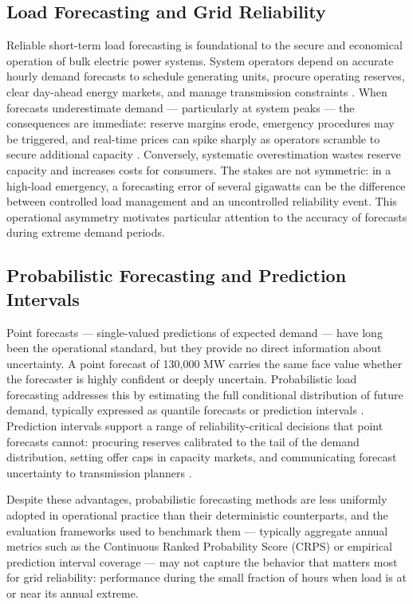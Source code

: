 \documentclass[12pt,a4paper]{article}
\begin{document}
\subsection{Load Forecasting and Grid Reliability}
Reliable short-term load forecasting is foundational to the secure and economical operation of bulk electric power systems. System operators depend on accurate hourly demand forecasts to schedule generating units, procure operating reserves, clear day-ahead energy markets, and manage transmission constraints \cite{hong2016tutorial}. When forecasts underestimate demand --- particularly at system peaks --- the consequences are immediate: reserve margins erode, emergency procedures may be triggered, and real-time prices can spike sharply as operators scramble to secure additional capacity \cite{nerc2014polar,pjm2014polar}. Conversely, systematic overestimation wastes reserve capacity and increases costs for consumers. The stakes are not symmetric: in a high-load emergency, a forecasting error of several gigawatts can be the difference between controlled load management and an uncontrolled reliability event. This operational asymmetry motivates particular attention to the accuracy of forecasts during extreme demand periods.


\subsection{Probabilistic Forecasting and Prediction Intervals}
Point forecasts --- single-valued predictions of expected demand --- have long been the operational standard, but they provide no direct information about uncertainty. A point forecast of 130,000 MW carries the same face value whether the forecaster is highly confident or deeply uncertain. Probabilistic load forecasting addresses this by estimating the full conditional distribution of future demand, typically expressed as quantile forecasts or prediction intervals \cite{hong2016probabilistic}. Prediction intervals support a range of reliability-critical decisions that point forecasts cannot: procuring reserves calibrated to the tail of the demand distribution, setting offer caps in capacity markets, and communicating forecast uncertainty to transmission planners \cite{hong2016tutorial}. 

Despite these advantages, probabilistic forecasting methods are less uniformly adopted in operational practice than their deterministic counterparts, and the evaluation frameworks used to benchmark them --- typically aggregate annual metrics such as the Continuous Ranked Probability Score (CRPS) or empirical prediction interval coverage --- may not capture the behavior that matters most for grid reliability: performance during the small fraction of hours when load is at or near its annual extreme.
\end{document}
